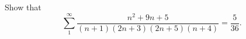 Show that
\[
\sum_{1}^{\infty} \frac{n^{2} + 9n + 5}{(n + 1)(2n + 3)(2n + 5)(n + 4)}
  = \frac{5}{36}.
\]


